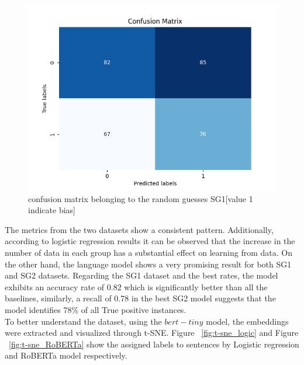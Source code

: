 \documentclass[11pt,a4paper]{article}
\begin{document}
\begin{figure}
    \centering
    \includegraphics[width=0.9\linewidth]{cm_SG1_random_guess.png}
    \caption{confusion matrix belonging to the random guesses SG1[value 1 indicate bias]}
    \label{fig:enter-label}
\end{figure}
The metrics from the two datasets show a consistent pattern. Additionally, according to logistic regression results it can be observed that the increase in the number of data in each group has a substantial effect on learning from data.
On the other hand, the language model shows a very promising result for both SG1 and SG2 datasets. Regarding the SG1 dataset and the best rates, the model exhibits an accuracy rate of 0.82 which is significantly better than all the baselines, similarly, a recall of 0.78 in the best SG2 model suggests that the model identifies 78\% of all True positive instances.\\
To better understand the dataset, using the $bert-tiny$ model, the embeddings were extracted and visualized through t-SNE. Figure ~\ref{fig:t-sne_logic} and Figure ~\ref{fig:t-sne_RoBERTa} show the assigned labels to sentences by Logistic regression and RoBERTa model respectively.
\end{document}
